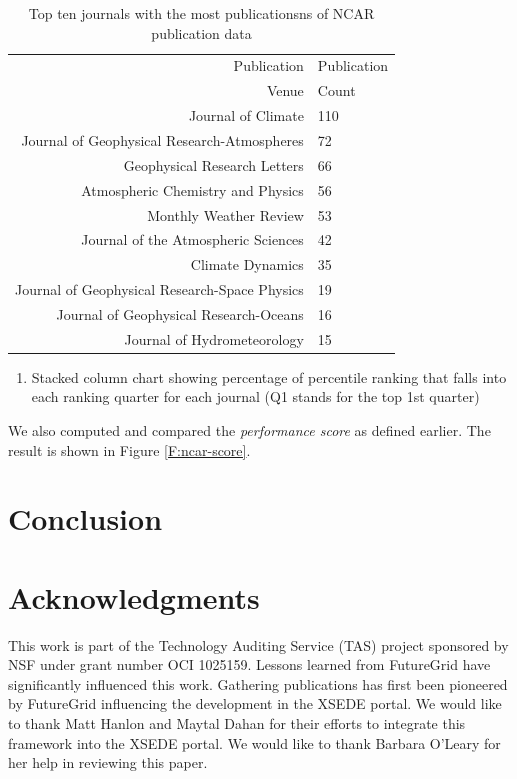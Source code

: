 \documentclass{sig-alternate}
\begin{document}
\begin{table}[h]
\caption{Top ten journals with the most publicationsns of NCAR
  publication data}
\label{T:ncar-pub-count-venue}
{\small
\begin{tabular}{rl}
Publication & Publication\\
Venue & Count \\
\hline
 Journal of Climate & 110	\\
 Journal of Geophysical Research-Atmospheres & 72	\\
 Geophysical Research Letters & 66	\\
 Atmospheric Chemistry and Physics & 56	\\
 Monthly Weather Review & 53	\\
 Journal of the Atmospheric Sciences & 42	\\
 Climate Dynamics & 35	\\
 Journal of Geophysical Research-Space Physics & 19	\\
 Journal of Geophysical Research-Oceans & 16	\\
 Journal of Hydrometeorology & 15	\\
\end{tabular}
}
\end{table}

\begin{enumerate}

\item Stacked column chart showing percentage of percentile ranking
  that falls into each ranking quarter for each journal (Q1 stands for
  the top 1st quarter)

\end{enumerate}

We also computed and compared the \emph{performance score} as defined
earlier. The result is shown in Figure \ref{F:ncar-score}.


\section{Conclusion}



\section{Acknowledgments}

 
This work is part of the Technology Auditing Service (TAS) project
sponsored by NSF under grant number OCI 1025159. Lessons learned from
FutureGrid have significantly influenced this work. Gathering
publications has first been pioneered by FutureGrid influencing the
development in the XSEDE portal. We would like to thank Matt Hanlon
and Maytal Dahan for their efforts to integrate this framework into
the XSEDE portal. We would like to thank Barbara O'Leary for her help
in reviewing this paper.
 
%
%
 
 

\end{document}
